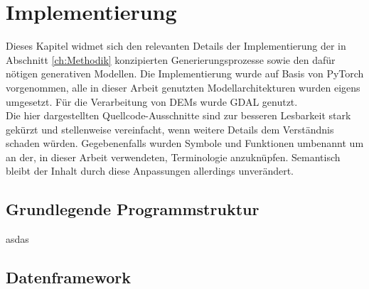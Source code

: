 \chapter{Implementierung}
\label{ch:Implementierung}

Dieses Kapitel widmet sich den relevanten Details der Implementierung der in Abschnitt \ref{ch:Methodik} konzipierten Generierungsprozesse sowie den dafür nötigen generativen Modellen. Die Implementierung wurde auf Basis von PyTorch vorgenommen, alle in dieser Arbeit genutzten Modellarchitekturen wurden eigens umgesetzt. Für die Verarbeitung von DEMs wurde GDAL genutzt.\\
Die hier dargestellten Quellcode-Ausschnitte sind zur besseren Lesbarkeit stark gekürzt und stellenweise vereinfacht, wenn weitere Details dem Verständnis schaden würden. Gegebenenfalls wurden Symbole und Funktionen umbenannt um an der, in dieser Arbeit verwendeten, Terminologie anzuknüpfen. Semantisch bleibt der Inhalt durch diese Anpassungen allerdings unverändert.

\section {Grundlegende Programmstruktur}

asdas



\section {Datenframework}

